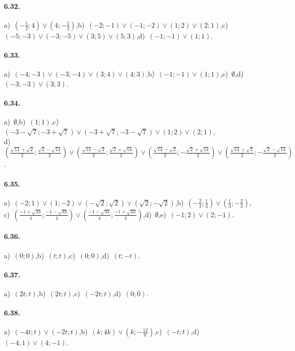 \paragraph{6.32.} a)~$\left(-\frac 1 2;4\right)\vee\left(4;-\frac 1 2\right)$,\quad b)~$(-2;-1)\vee(-1;-2)\vee(1;2)\vee(2;1)$,\quad c)~$(-5;-3)\vee(-3;-5)\vee(3;5)\vee(5;3)$,\quad d)~$(-1;-1)\vee(1;1)$.

\paragraph{6.33.} a)~$(-4;-3)\vee(-3;-4)\vee(3;4)\vee(4;3)$,\quad b)~$(-1;-1)\vee(1;1)$,\quad c)~$\emptyset$,\quad d)~$(-3;-3)\vee(3;3)$.

\paragraph{6.34.} a)~$\emptyset$,\quad b)~$(1;1)$,\quad c)~$(-3-\sqrt 7;-3+\sqrt 7)\vee(-3+\sqrt 7;-3-\sqrt 7)\vee(1;2)\vee(2;1)$,\protect\\
\quad d)~$\left(\frac{\sqrt{14}+\sqrt 2} 2;\frac{\sqrt 2-\sqrt{14}} 2\right)\vee\left(\frac{\sqrt{14}-\sqrt 2} 2;\frac{\sqrt 2+\sqrt{14}} 2\right)\vee\left(\frac{\sqrt{14}-\sqrt 2} 2;-\frac{\sqrt 2+\sqrt{14}} 2\right)\vee\left(\frac{\sqrt{14}+\sqrt 2} 2;-\frac{\sqrt 2-\sqrt{14}} 2\right)$.

\paragraph{6.35.} a)~$(-2;1)\vee(1;-2)\vee(-\sqrt {2};\sqrt{2})\vee(\sqrt {2};-\sqrt{2})$,\quad b)~$\left(-\frac 2 3;\frac 1 3\right)\vee\left(\frac 1 3;-\frac 2 3\right)$,\protect\\
\quad c)~$\left(\frac{-1+\sqrt{33}} 4;\frac{-1-\sqrt{33}} 4\right)\vee \left(\frac{-1-\sqrt{33}} 4;\frac{-1+\sqrt{33}} 4\right)$,\quad d)~$\emptyset$,\quad e)~$(-1;2)\vee(2;-1)$.

\paragraph{6.36.} a)~$(0;0)$,\quad b)~$(t;t)$,\quad c)~$(0;0)$,\quad d)~$(t;-t)$.

\paragraph{6.37.} a)~$(2t;t)$,\quad b)~$(2t;t)$,\quad c)~$(-2t;t)$,\quad d)~$(0;0)$.

\paragraph{6.38.} a)~$(-4t;t)\vee(-2t;t)$,\quad b)~$(k;4k)\vee(k;-\frac{1 2}k)$,\quad c)~$(-t;t)$,\quad d)~$(-4;1)\vee(4;-1)$.

